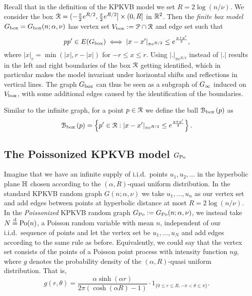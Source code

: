 Recall that in the definition of the KPKVB model we set $R = 2\log(n/\nu)$.
We consider the box ${\mathcal R} = (-\frac{\pi}{2}e^{R/2}, \frac{\pi}{2}e^{R/2}] \times (0, R]$ in ${\mathbb R}^2$. 
Then the \emph{finite box model} $G_{\mathrm{box}} = G_{\mathrm{box}}(n;\alpha, \nu)$ has vertex set $V_{\text{box}} := \mathcal{P} \cap {\mathcal R}$ and edge set such that
\[
	pp' \in E(G_{\mathrm{box}}) \iff |x - x'|_{\pi e^{R/2}} \leq e^{\frac{y + y'}{2}},
\]
where $|x|_{r} = \min( |x|, r - |x|)$ for $-r\leq x\leq r$. Using $|.|_{\pi e^{R/2}}$ instead of $|.|$ results in the left and right boundaries of the box ${\mathcal R}$ getting identified, which in particular makes the model invariant under horizontal shifts and reflections in vertical lines. 
The graph $G_{\mathrm{box}}$ can thus be seen as a subgraph of $G_{\infty}$ induced on $V_{\text{box}}$, with some additional edges caused by the identification of the boundaries.

Similar to the infinite graph, for a point $p \in {\mathcal R}$ we define the ball ${\mathcal B}_{\text{box}}\left(p\right)$ as
\begin{equation}\label{eq:def_ball_P_n}
	{\mathcal B}_{\text{box}}\left(p\right) = 
	\left\{p' \in {\mathcal R} : |x - x'|_{\pi e^{R/2}} \leq e^{\frac{y + y'}{2}}\right\}.
\end{equation}


\subsection{The Poissonized KPKVB model $G_{{\mathrm{Po}}}$}


Imagine that we have an infinite supply of i.i.d.~points $u_1, u_2, \dots$ in the hyperbolic plane ${\mathbb H}$ chosen according to the $(\alpha, R)$-quasi uniform distribution. In the standard KPKVB random graph $G(n;\alpha,\nu)$ we take $u_1,\dots, u_n$ as our vertex set and add edges between points at hyperbolic distance at most $R = 2\log(n/\nu)$. In the \emph{Poissonized} KPKVB random graph $G_{{\mathrm{Po}}} := G_{{\mathrm{Po}}}(n;\alpha,\nu)$, we instead take $N\stackrel{\text{d}}{=} {\mathrm{Po}}(n)$, a Poisson random variable 
with mean $n$, independent of our i.i.d.~sequence of points and let the vertex set be $u_1,\dots, u_N$ and add edges 
according to the same rule as before. Equivalently, we could say that the vertex set consists of the points of a Poisson point process with intensity function $n g$, where $g$ denotes the probability density of the $(\alpha,R)$-quasi uniform distribution. That is,
\begin{equation}\label{eq:def_quasi_uniform_density}
	g(r,\theta) = \frac{\alpha\sinh(\alpha r)}{2\pi(\cosh(\alpha R) - 1)} \cdot 1_{\{0\leq r\leq R, -\pi<\theta\leq \pi\}}.
\end{equation}

